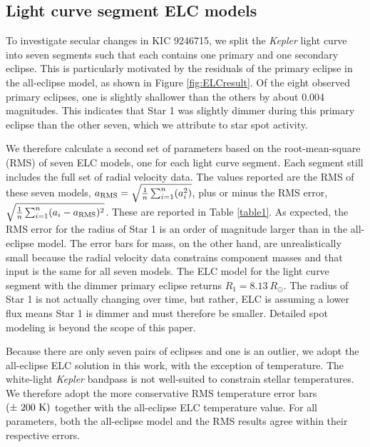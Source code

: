 \subsection{Light curve segment ELC models}\label{segment}
To investigate secular changes in KIC 9246715, we split the \emph{Kepler} light curve into seven segments such that each contains one primary and one secondary eclipse. This is particularly motivated by the residuals of the primary eclipse in the all-eclipse model, as shown in Figure \ref{fig:ELCresult}. Of the eight observed primary eclipses, one is slightly shallower than the others by about 0.004 magnitudes. This indicates that Star 1 was slightly dimmer during this primary eclipse than the other seven, which we attribute to star spot activity. 

We therefore calculate a second set of parameters based on the root-mean-square (RMS) of seven ELC models, one for each light curve segment. Each segment still includes the full set of radial velocity data. The values reported are the RMS of these seven models, $a_{\rm{RMS}} = \sqrt{\frac{1}{n} \sum_{i=1}^n (a_i^2)}$, plus or minus the RMS error, $\sqrt{\frac{1}{n} \sum_{i=1}^n (a_i - a_{\rm{RMS}})^2}$. These are reported in Table \ref{table1}. As expected, the RMS error for the radius of Star 1 is an order of magnitude larger than in the all-eclipse model. The error bars for mass, on the other hand, are unrealistically small because the radial velocity data constrains component masses and that input is the same for all seven models. The ELC model for the light curve segment with the dimmer primary eclipse returns $R_1 = 8.13 \ R_{\odot}$. The radius of Star 1 is not actually changing over time, but rather, ELC is assuming a lower flux means Star 1 is dimmer and must therefore be smaller. Detailed spot modeling is beyond the scope of this paper.

Because there are only seven pairs of eclipses and one is an outlier, we adopt the all-eclipse ELC solution in this work, with the exception of temperature. The white-light \emph{Kepler} bandpass is not well-suited to constrain stellar temperatures. We therefore adopt the more conservative RMS temperature error bars $(\pm ~200 \ \rm{K})$ together with the all-eclipse ELC temperature value. For all parameters, both the all-eclipse model and the RMS results agree within their respective errors.
